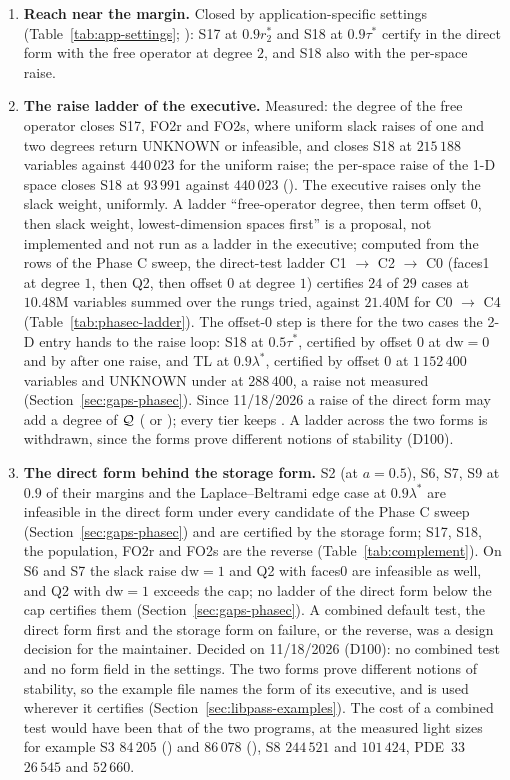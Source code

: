 \begin{enumerate}
\item \textbf{Reach near the margin.} Closed by application-specific settings (Table~\ref{tab:app-settings}; \gapsref): S17 at $0.9r_2^*$ and S18 at $0.9\tau^*$ certify in the direct form with the free operator at degree $2$, and S18 also with the per-space raise.
\item \textbf{The raise ladder of the executive.} Measured: the degree of the free operator closes S17, FO2r and FO2s, where uniform slack raises of one and two degrees return UNKNOWN or infeasible, and closes S18 at $215\,188$ variables against $440\,023$ for the uniform raise; the per-space raise of the 1-D space closes S18 at $93\,991$ against $440\,023$ (\gapsref). The executive raises only the slack weight, uniformly. A ladder ``free-operator degree, then term offset $0$, then slack weight, lowest-dimension spaces first'' is a proposal, not implemented and not run as a ladder in the executive; computed from the rows of the Phase C sweep, the direct-test ladder C1 $\to$ C2 $\to$ C0 (faces1 at degree $1$, then Q2, then offset $0$ at degree $1$) certifies $24$ of $29$ cases at $10.48$M variables summed over the rungs tried, against $21.40$M for C0 $\to$ C4 (Table~\ref{tab:phasec-ladder}). The offset-0 step is there for the two cases the 2-D entry  hands to the raise loop: S18 at $0.5\tau^*$, certified by offset $0$ at $\mathrm{dw}=0$ and by  after one raise, and TL at $0.9\lambda^*$, certified by offset $0$ at $1\,152\,400$ variables and UNKNOWN under  at $288\,400$, a raise not measured (Section~\ref{sec:gaps-phasec}). Since 11/18/2026 a raise of the direct form may add a degree of $\mathcal{Q}$ (  or ); every tier keeps . A ladder across the two forms is withdrawn, since the forms prove different notions of stability (D100).
\item \textbf{The direct form behind the storage form.} S2 (at $a=0.5$), S6, S7, S9 at $0.9$ of their margins and the Laplace--Beltrami edge case at $0.9\lambda^*$ are infeasible in the direct form under every candidate of the Phase C sweep (Section~\ref{sec:gaps-phasec}) and are certified by the storage form; S17, S18, the population, FO2r and FO2s are the reverse (Table~\ref{tab:complement}). On S6 and S7 the slack raise $\mathrm{dw}=1$ and Q2 with faces0 are infeasible as well, and Q2 with $\mathrm{dw}=1$ exceeds the cap; no ladder of the direct form below the cap certifies them (Section~\ref{sec:gaps-phasec}). A combined default test, the direct form first and the storage form on failure, or the reverse, was a design decision for the maintainer. Decided on 11/18/2026 (D100): no combined test and no form field in the settings. The two forms prove different notions of stability, so the example file names the form of its executive, and  is used wherever it certifies (Section~\ref{sec:libpass-examples}). The cost of a combined test would have been that of the two programs, at the measured light sizes for example S3 $84\,205$ () and $86\,078$ (), S8 $244\,521$ and $101\,424$, PDE~33 $26\,545$ and $52\,660$.

\end{enumerate}
